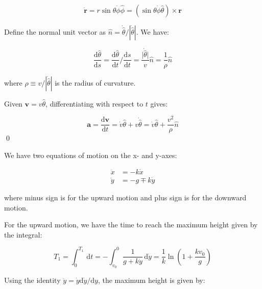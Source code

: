 \documentclass[12pt]{article}
\begin{document}
\begin{equation}
    \dot{\mathbf{r}} = r \sin{\theta} \dot{\phi} \hat{\phi} = (\sin{\theta} \dot{\phi} \hat{\theta}) \times \mathbf{r}
\end{equation}

Define the normal unit vector as $\hat{n} = \dot{\hat{\theta}}/ \left\lvert \dot{\hat{\theta}} \right\rvert$. We have:

\begin{equation}
    \frac{\mathrm{d}\hat{\theta}}{\mathrm{d}s} = \frac{\mathrm{d}\hat{\theta}}{\mathrm{d}t} / \frac{\mathrm{d}s}{\mathrm{d}t} = \frac{\lvert \dot{\hat{\theta}} \rvert}{v} \hat{n} = \frac{1}{\rho} \hat{n}
\end{equation}

where $\rho \equiv v/\left\lvert \dot{\hat{\theta}} \right\rvert$ is the radius of curvature.

Given $\mathbf{v} = v \hat{\theta}$, differentiating with respect to $t$ gives:

\begin{equation}
    \mathbf{a} = \frac{\mathrm{d}\mathbf{v}}{\mathrm{d}t} = \dot{v} \hat{\theta} + v \dot{\hat{\theta}} = \dot{v} \hat{\theta} + \frac{v^{2}}{\rho} \hat{n}
\end{equation}
\qed


We have two equations of motion on the x- and y-axes:

\begin{equation}
\begin{split}
    \ddot{x} &= -k \dot{x} \\
    \ddot{y} &= -g \mp k \dot{y}
\end{split}
\end{equation}

where minus sign is for the upward motion and plus sign is for the downward motion.

For the upward motion, we have the time to reach the maximum height given by the integral:

\begin{equation}
    T_{1} = \int_{0}^{T_{1}} \, \mathrm{d}t = -\int_{v_{0}}^{0} \frac{1}{g + k\dot{y}} \, \mathrm{d}\dot{y} = \frac{1}{k} \ln{\left( 1 + \frac{k v_{0}}{g} \right)}
\end{equation}

Using the identity $\ddot{y} = \dot{y} \mathrm{d}\dot{y}/\mathrm{d}y$, the maximum height is given by:
\end{document}
